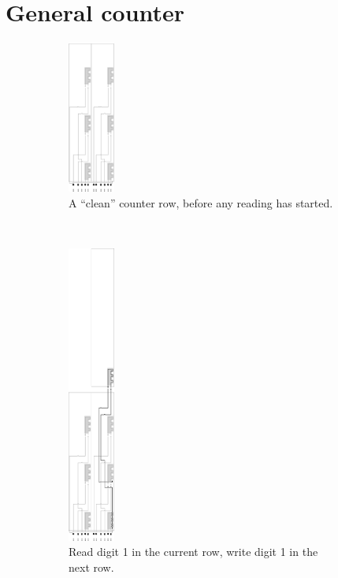 
\section{General counter}


\begin{figure}[H]
    \centering
    \begin{subfigure}[t]{0.2\textwidth}
        \centering
        \includegraphics[width=0.6in]{counter_read_start_general_case3_middle_level}
        \caption{\label{fig:counter_read_start_general_case3_middle_level} A ``clean'' counter row, before any reading has started.}
    \end{subfigure}%
    ~
    \begin{subfigure}[t]{0.2\textwidth}
        \centering
        \includegraphics[width=0.6in]{counter_read_digit1_return_read_digit2_general_case3_middle_level}
        \caption{\label{fig:counter_read_digit1_return_read_digit2_general_case3_middle_level} Read digit 1 in the current row, write digit 1 in the next row.}
    \end{subfigure}%
    ~
    \begin{subfigure}[t]{0.2\textwidth}

\end{subfigure}
\end{figure}
